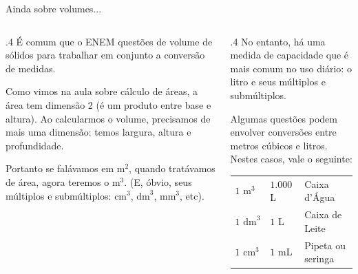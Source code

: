 \documentclass[aspectratio=169, t, 8pt]{beamer}
\begin{document}
    \begin{frame} {Ainda sobre volumes...}
        \vspace{1.2em}
        \begin{columns}[totalwidth=.9\textwidth]
            \begin{column}{.4\textwidth}
                É comum que o ENEM  questões de volume de sólidos para trabalhar em conjunto a conversão de medidas.
                
                \vspace{1em}
                
                Como vimos na aula sobre cálculo de áreas, a área tem dimensão 2 (é um produto entre base e altura). Ao calcularmos o volume, precisamos de mais uma dimensão: temos largura, altura e profundidade.
                
                \vspace{1em}
                
                Portanto se falávamos em $\text{m}^2$, quando tratávamos de área, agora teremos o $\text{m}^3$. (E, óbvio, seus múltiplos e submúltiplos: $\text{cm}^3$, $\text{dm}^3$, $\text{mm}^3$, etc).
                
                
            \end{column}

            \begin{column}{.4\textwidth}
                No entanto, há uma medida de capacidade que é mais comum no uso diário: o litro e seus múltiplos e submúltiplos.
                
                \vspace{1em}
                
                Algumas questões podem envolver conversões entre metros cúbicos e litros. Nestes casos, vale o seguinte:

                \vspace{1em}

                \begin{table}
                    \centering
                    \begin{tabular}{l l l}
                        \toprule
                        \rowcolor{SoftOrange}
                        \multicolumn{3}{c}{\textbf{Conversão de Unidades}}\\
                        \midrule
                        $1 \text{ m}^3$ & $1.000$ L & Caixa d'Água\\
                        
                        $1 \text{ dm}^3$ & $1$ L & Caixa de Leite \\
                        
                        $1 \text{ cm}^3$ & $1$ mL & Pipeta ou seringa\\
                        \bottomrule
                \end{tabular}
                \end{table}
            \end{column}
        \end{columns}
    \end{frame}
\end{document}
